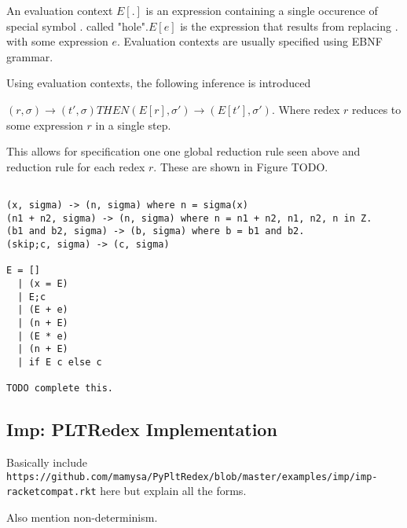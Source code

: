 An evaluation context $E[.]$ is an expression containing a single occurence of special symbol $.$ called "hole".$E[e]$ is the expression that results from replacing $.$ with some expression $e$. Evaluation contexts are usually specified using EBNF grammar. 

Using evaluation contexts, the following inference is introduced

$(r, \sigma) \rightarrow (t\prime, \sigma) THEN (E[r], \sigma\prime) \rightarrow (E[t\prime], \sigma\prime)$. Where redex $r$ reduces to some expression $r$ in a single step.

This allows for specification one one global reduction rule seen above and reduction rule for each redex $r$. These are shown in Figure TODO.

\begin{lstlisting}

(x, sigma) -> (n, sigma) where n = sigma(x)
(n1 + n2, sigma) -> (n, sigma) where n = n1 + n2, n1, n2, n in Z.
(b1 and b2, sigma) -> (b, sigma) where b = b1 and b2.
(skip;c, sigma) -> (c, sigma)

E = []
  | (x = E)
  | E;c
  | (E + e)
  | (n + E)
  | (E * e)
  | (n + E)
  | if E c else c
 
TODO complete this.
\end{lstlisting}


\subsection{Imp: PLTRedex Implementation}

Basically include \texttt{https://github.com/mamysa/PyPltRedex/blob/master/examples/imp/imp-racketcompat.rkt} here but explain all the forms.

Also mention non-determinism.

